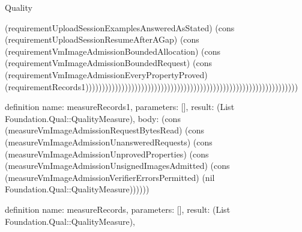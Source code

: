 \begin{lexlean}{Quality}
\begin{semanticmodule}
{(requirementUploadSessionExamplesAnsweredAsStated) (cons (requirementUploadSessionResumeAfterAGap) (cons (requirementVmImageAdmissionBoundedAllocation) (cons (requirementVmImageAdmissionBoundedRequest) (cons (requirementVmImageAdmissionEveryPropertyProved) (requirementRecords1)))))))))))))))))))))))))))))))))))))))))))))))))))))))))))))))))
}

definition{
  name: measureRecords1,
  parameters: [],
  result: (List Foundation.Qual::QualityMeasure),
  body: (cons (measureVmImageAdmissionRequestBytesRead) (cons (measureVmImageAdmissionUnansweredRequests) (cons (measureVmImageAdmissionUnprovedProperties) (cons (measureVmImageAdmissionUnsignedImagesAdmitted) (cons (measureVmImageAdmissionVerifierErrorsPermitted) (nil Foundation.Qual::QualityMeasure))))))
}

definition{
  name: measureRecords,
  parameters: [],
  result: (List Foundation.Qual::QualityMeasure),
}
\end{semanticmodule}
\end{lexlean}
